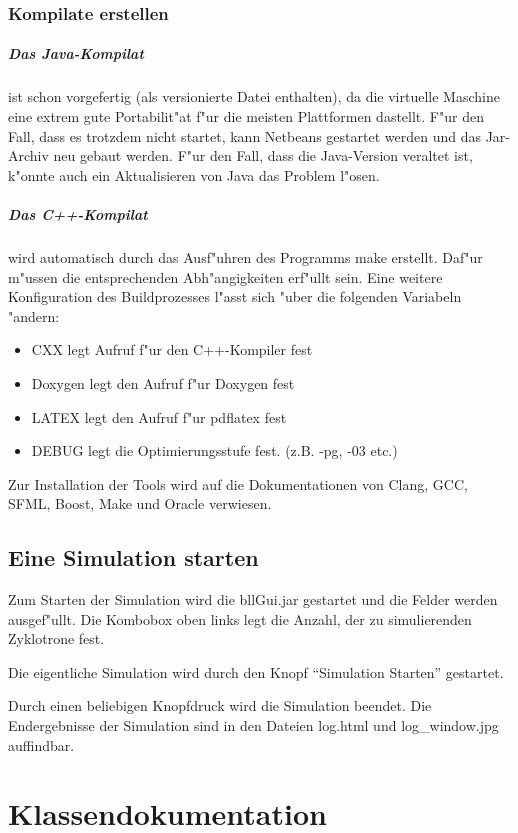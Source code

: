 \documentclass[14pt, a4paper]{report}
\begin{document}
\subsection{Kompilate erstellen}
\paragraph{Das Java-Kompilat} ist schon vorgefertig (als versionierte Datei enthalten), 
da die virtuelle Maschine eine 
extrem gute Portabilit"at f"ur die meisten Plattformen dastellt. F"ur den Fall, dass es
trotzdem nicht startet, kann Netbeans gestartet werden und das Jar-Archiv neu gebaut werden.
F"ur den Fall, dass die Java-Version veraltet ist, k"onnte auch ein Aktualisieren von 
Java das Problem l"osen.

\paragraph{Das C++-Kompilat} wird automatisch durch das Ausf"uhren des Programms make
erstellt. Daf"ur m"ussen die entsprechenden Abh"angigkeiten erf"ullt sein. Eine weitere
Konfiguration des Buildprozesses l"asst sich "uber die folgenden Variabeln "andern:
\begin{itemize}
\item CXX legt Aufruf f"ur den C++-Kompiler fest
\item Doxygen legt den Aufruf f"ur Doxygen fest
\item LATEX legt den Aufruf f"ur pdflatex fest 
\item DEBUG legt die Optimierungsstufe fest. (z.B. -pg, -03 etc.)
\end{itemize}

Zur Installation der Tools wird auf die Dokumentationen von Clang, GCC, SFML, Boost, Make und
Oracle verwiesen.

\section{Eine Simulation starten}
Zum Starten der Simulation wird die bllGui.jar gestartet und die Felder werden 
ausgef"ullt. Die Kombobox oben links legt die Anzahl, der zu simulierenden Zyklotrone 
fest.

Die eigentliche Simulation wird durch den Knopf "`Simulation Starten"' gestartet.

Durch einen beliebigen Knopfdruck wird die Simulation beendet. Die Endergebnisse der
Simulation sind in den Dateien log.html und log\_window.jpg auffindbar.

\chapter{Klassendokumentation}
\newpage
\end{document}

